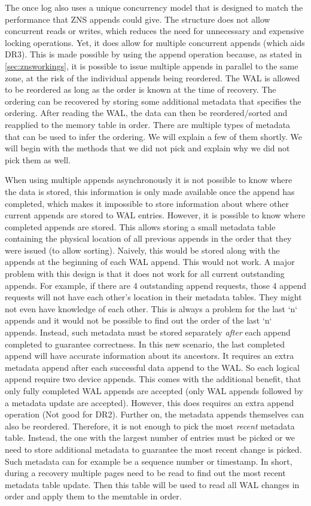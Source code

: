 The once log also uses a unique concurrency model that is designed to match the performance that ZNS appends could give. The structure does not allow concurrent reads or writes, which reduces the need for unnecessary and expensive locking operations. Yet, it does allow for multiple concurrent appends (which aids DR3). This is made possible by using the append operation because, as stated in \autoref{sec:znsworkings}, it is possible to issue multiple appends in parallel to the same zone, at the risk of the individual appends being reordered. The WAL is allowed to be reordered as long as the order is known at the time of recovery. The ordering can be recovered by storing some additional metadata that specifies the ordering. After reading the WAL, the data can then be reordered/sorted and reapplied to the memory table in order. There are multiple types of metadata that can be used to infer the ordering. We will explain a few of them shortly. We will begin with the methods that we did not pick and explain why we did not pick them as well.

When using multiple appends asynchronously it is not possible to know where the data is stored, this information is only made available once the append has completed, which makes it impossible to store information about where other current appends are stored to WAL entries. However, it is possible to know where completed appends are stored. This allows storing a small metadata table containing the physical location of all previous appends in the order that they were issued (to allow sorting). Naively, this would be stored along with the appends at the beginning of each WAL append. This would not work. A major problem with this design is that it does not work for all current outstanding appends. For example, if there are 4 outstanding append requests, those 4 append requests will not have each other's location in their metadata tables. They might not even have knowledge of each other. This is always a problem for the last `n` appends and it would not be possible to find out the order of the last `n` appends. Instead, such metadata must be stored separately \textit{after} each append completed to guarantee correctness. In this new scenario, the last completed append will have accurate information about its ancestors. It requires an extra metadata append after each successful data append to the WAL. So each logical append require two device appends. This comes with the additional benefit, that only fully completed WAL appends are accepted (only WAL appends followed by a metadata update are accepted). However, this does requires an extra append operation (Not good for DR2). Further on, the metadata appends themselves can also be reordered. Therefore, it is not enough to pick the most \textit{recent} metadata table. Instead, the one with the largest number of entries must be picked or we need to store additional metadata to guarantee the most recent change is picked. Such metadata can for example be a sequence number or timestamp. In short, during a recovery multiple pages need to be read to find out the most recent metadata table update. Then this table will be used to read all WAL changes in order and apply them to the memtable in order.

